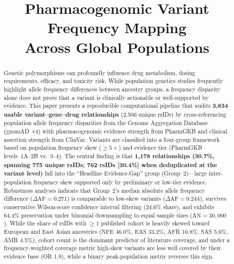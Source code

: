 \documentclass[conference]{IEEEtran}
\begin{document}
\title{Pharmacogenomic Variant Frequency Mapping\\Across Global Populations}

\author{
}

\maketitle

\begin{abstract}
Genetic polymorphisms can profoundly influence drug metabolism, dosing requirements, efficacy, and toxicity risk. While population genetics studies frequently highlight allele frequency differences between ancestry groups, a frequency disparity alone does not prove that a variant is clinically actionable or well-supported by evidence.
This paper presents a reproducible computational pipeline that audits \textbf{3,834 usable variant--gene--drug relationships} (2,506 unique rsIDs) by cross-referencing population allele frequency disparities from the Genome Aggregation Database (gnomAD~v4) with pharmacogenomic evidence strength from PharmGKB and clinical assertion strength from ClinVar.
Variants are classified into a four-group framework based on population frequency skew ($\ge 5\times$) and evidence tier (PharmGKB levels~1A--2B vs.\ 3--4).
The central finding is that \textbf{1,178 relationships (30.7\%, spanning 775 unique rsIDs; 762 rsIDs [30.4\%] when deduplicated at the variant level)} fall into the ``Headline Evidence-Gap'' group (Group~2)---large inter-population frequency skew supported only by preliminary or low-tier evidence.
Robustness analyses indicate that Group~2's median absolute allele frequency difference ($\Delta\text{AF} = 0.271$) is comparable to low-skew variants ($\Delta\text{AF} = 0.244$), survives conservative Wilson-score confidence interval filtering (24.6\% share), and exhibits 64.4\% preservation under binomial downsampling to equal sample sizes ($\text{AN} = 30{,}000$).
While the share of rsIDs with $\ge 1$ published cohort is heavily skewed toward European and East Asian ancestries (NFE 46.0\%, EAS 33.2\%, AFR 10.8\%, SAS 5.6\%, AMR 4.5\%), cohort count is the dominant predictor of literature coverage, and under a frequency-weighted coverage metric high-skew variants are less well covered by their evidence base (OR 1.9), while a binary peak-population metric reverses this sign.
\end{abstract}
\end{document}
